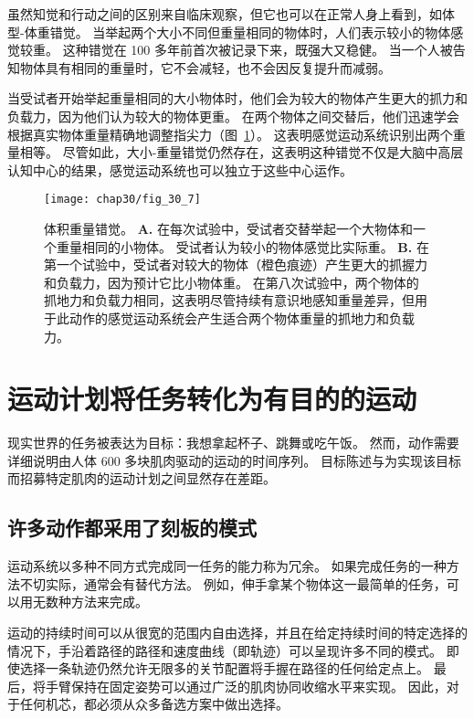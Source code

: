 虽然知觉和行动之间的区别来自临床观察，但它也可以在正常人身上看到，如体型-体重错觉。
当举起两个大小不同但重量相同的物体时，人们表示较小的物体感觉较重。
这种错觉在 100 多年前首次被记录下来，既强大又稳健。
当一个人被告知物体具有相同的重量时，它不会减轻，也不会因反复提升而减弱。


当受试者开始举起重量相同的大小物体时，他们会为较大的物体产生更大的抓力和负载力，因为他们认为较大的物体更重。
在两个物体之间交替后，他们迅速学会根据真实物体重量精确地调整指尖力（图~\ref{fig:30_7}）。 
这表明感觉运动系统识别出两个重量相等。
尽管如此，大小-重量错觉仍然存在，这表明这种错觉不仅是大脑中高层认知中心的结果，感觉运动系统也可以独立于这些中心运作。


\begin{figure}[htbp]
	\centering
	\texttt{[image: chap30/fig\_30\_7]}
	\caption{体积重量错觉。
		\textbf{A.} 在每次试验中，受试者交替举起一个大物体和一个重量相同的小物体。
		受试者认为较小的物体感觉比实际重。
		\textbf{B.} 在第一个试验中，受试者对较大的物体（橙色痕迹）产生更大的抓握力和负载力，因为预计它比小物体重。
		在第八次试验中，两个物体的抓地力和负载力相同，这表明尽管持续有意识地感知重量差异，但用于此动作的感觉运动系统会产生适合两个物体重量的抓地力和负载力\cite{flanagan2000independence}。}
	\label{fig:30_7}
\end{figure}



\section{运动计划将任务转化为有目的的运动}

现实世界的任务被表达为目标：我想拿起杯子、跳舞或吃午饭。
然而，动作需要详细说明由人体 600 多块肌肉驱动的运动的时间序列。
目标陈述与为实现该目标而招募特定肌肉的运动计划之间显然存在差距。



\subsection{许多动作都采用了刻板的模式}

运动系统以多种不同方式完成同一任务的能力称为冗余。 
如果完成任务的一种方法不切实际，通常会有替代方法。 
例如，伸手拿某个物体这一最简单的任务，可以用无数种方法来完成。


运动的持续时间可以从很宽的范围内自由选择，并且在给定持续时间的特定选择的情况下，手沿着路径的路径和速度曲线（即轨迹）可以呈现许多不同的模式。
即使选择一条轨迹仍然允许无限多的关节配置将手握在路径的任何给定点上。
最后，将手臂保持在固定姿势可以通过广泛的肌肉协同收缩水平来实现。
因此，对于任何机芯，都必须从众多备选方案中做出选择。


